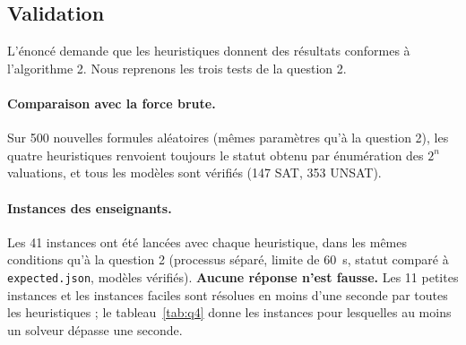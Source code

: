 \documentclass[11pt,a4paper]{article}
\begin{document}
\subsection{Validation}

L'énoncé demande que les heuristiques donnent des résultats conformes à l'algorithme 2. Nous
reprenons les trois tests de la question 2.

\paragraph{Comparaison avec la force brute.} Sur 500 nouvelles formules aléatoires (mêmes
paramètres qu'à la question 2), les quatre heuristiques renvoient toujours le statut obtenu par
énumération des $2^n$ valuations, et tous les modèles sont vérifiés (147 SAT, 353 UNSAT).

\paragraph{Instances des enseignants.} Les 41 instances ont été lancées avec chaque heuristique,
dans les mêmes conditions qu'à la question 2 (processus séparé, limite de 60~s, statut comparé à
\texttt{expected.json}, modèles vérifiés). \textbf{Aucune réponse n'est fausse.} Les 11 petites
instances et les instances faciles sont résolues en moins d'une seconde par toutes les
heuristiques ; le tableau~\ref{tab:q4} donne les instances pour lesquelles au moins un solveur
dépasse une seconde.
\end{document}
